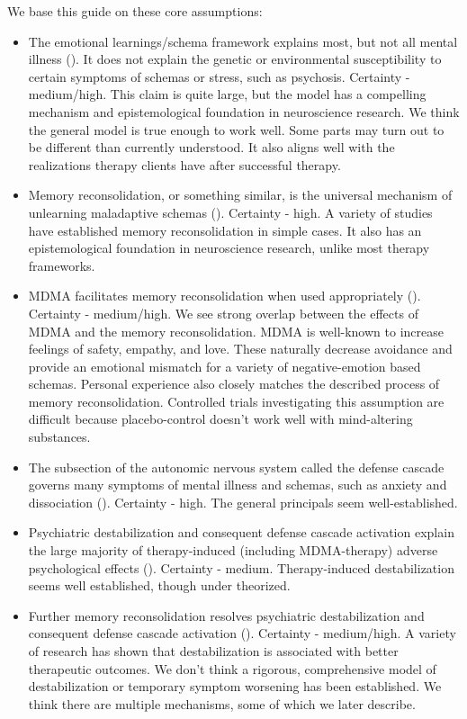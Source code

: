 \documentclass[12pt,letterpaper]{article}
\begin{document}
We base this guide on these core assumptions:
\begin{itemize}
	\item The emotional learnings/schema framework explains most, but not all mental illness (\textcite{lesswrongCoherenceTherapy,eckerUnlocking}). It does not explain the genetic or environmental susceptibility to certain symptoms of schemas or stress, such as psychosis. Certainty - medium/high. This claim is quite large, but the model has a compelling mechanism and epistemological foundation in neuroscience research. We think the general model is true enough to work well. Some parts may turn out to be different than currently understood. It also aligns well with the realizations therapy clients have after successful therapy.
	\item Memory reconsolidation, or something similar, is the universal mechanism of unlearning maladaptive schemas (\textcite{lesswrongCoherenceTherapy,eckerUnlocking}). Certainty - high. A variety of studies have established memory reconsolidation in simple cases. It also has an epistemological foundation in neuroscience research, unlike most therapy frameworks. 
	\item MDMA facilitates memory reconsolidation when used appropriately (\textcite{fedduciaMDMAMemoryReconsolidation}). Certainty - medium/high. We see strong overlap between the effects of MDMA and the memory reconsolidation. MDMA is well-known to increase feelings of safety, empathy, and love. These naturally decrease avoidance and provide an emotional mismatch for a variety of negative-emotion based schemas. Personal experience also closely matches the described process of memory reconsolidation. Controlled trials investigating this assumption are difficult because placebo-control doesn't work well with mind-altering substances.
	\item The subsection of the autonomic nervous system called the defense cascade governs many symptoms of mental illness and schemas, such as anxiety and dissociation (\textcite{kozlowskaDefenseCascade}). Certainty - high. The general principals seem well-established.
	\item Psychiatric destabilization and consequent defense cascade activation explain the large majority of therapy-induced (including MDMA-therapy) adverse psychological effects (\textcite{olthofDestabilization}). Certainty - medium. Therapy-induced destabilization seems well established, though under theorized.
	\item Further memory reconsolidation resolves psychiatric destabilization and consequent defense cascade activation (\textcite{olthofDestabilization}). Certainty - medium/high. A variety of research has shown that destabilization is associated with better therapeutic outcomes. We don't think a rigorous, comprehensive model of destabilization or temporary symptom worsening has been established. We think there are multiple mechanisms, some of which we later describe.
\end{itemize}
\end{document}
